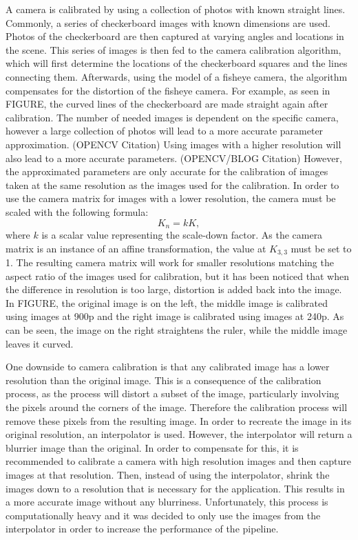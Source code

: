 \documentclass[arbeit=studie,oneside,BCOR=12mm]{ArbeitRST}
\begin{document}
A camera is calibrated by using a collection of photos with known straight
lines. Commonly, a series of checkerboard images with known dimensions are
used. Photos of the checkerboard are then captured at varying angles and
locations in the scene. This series of images is then fed to the camera
calibration algorithm, which will first determine the locations of the
checkerboard squares and the lines connecting them.  Afterwards, using the
model of a fisheye camera, the algorithm compensates for the distortion of the
fisheye camera. For example, as seen in FIGURE, the curved lines of the
checkerboard are made straight again after calibration. The number of needed
images is dependent on the specific camera, however a large collection of
photos will lead to a more accurate parameter approximation. (OPENCV Citation)
Using images with a higher resolution will also lead to a more accurate
parameters. (OPENCV/BLOG Citation) However, the approximated parameters are
only accurate for the calibration of images taken at the same resolution as the
images used for the calibration. In order to use the camera matrix for images
with a lower resolution, the camera must be scaled with the following formula:
\begin{equation}
  K_n = k K,
\end{equation}
where $k$ is a scalar value representing the scale-down factor. As the camera
matrix is an instance of an affine transformation, the value at $K_{3, 3}$ must
be set to 1. The resulting camera matrix will work for smaller resolutions
matching the aspect ratio of the images used for calibration, but it has been
noticed that when the difference in resolution is too large, distortion is
added back into the image. In FIGURE, the original image is on the left, the
middle image is calibrated using images at 900p and the right image is
calibrated using images at 240p. As can be seen, the image on the right
straightens the ruler, while the middle image leaves it curved.

One downside to camera calibration is that any calibrated image has a lower
resolution than the original image. This is a consequence of the calibration
process, as the process will distort a subset of the image, particularly
involving the pixels around the corners of the image. Therefore the calibration
process will remove these pixels from the resulting image. In order to recreate
the image in its original resolution, an interpolator is used. However, the
interpolator will return a blurrier image than the original. In order to
compensate for this, it is recommended to calibrate a camera with high
resolution images and then capture images at that resolution. Then, instead of
using the interpolator, shrink the images down to a resolution that is
necessary for the application.  This results in a more accurate image without
any blurriness. Unfortunately, this process is computationally heavy and it was
decided to only use the images from the interpolator in order to increase the
performance of the pipeline.
\end{document}

